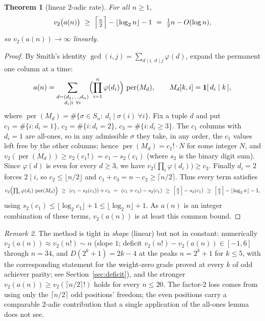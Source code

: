 \documentclass[11pt]{article}
\newtheorem{theorem}{Theorem}
\theoremstyle{remark}\newtheorem{remark}[theorem]{Remark}
\DeclareMathOperator{\perm}{per}
\begin{document}
\begin{theorem}[linear $2$-adic rate]\label{thm:linear}
For all $n\ge1$,
\[
  v_2\bigl(a(n)\bigr)\ \ge\ \Bigl\lceil \tfrac n2\Bigr\rceil-\lfloor\log_2 n\rfloor-1
  \ =\ \tfrac12 n-O(\log n),
\]
so $v_2(a(n))\to\infty$ \emph{linearly}.
\end{theorem}
\begin{proof}
By Smith's identity $\gcd(i,j)=\sum_{d\mid i,\ d\mid j}\varphi(d)$, expand the permanent one
column at a time:
\[
  a(n)=\sum_{\substack{d=(d_1,\dots,d_n)\\ d_i\mid i\ \forall i}}
        \Bigl(\prod_{i=1}^n\varphi(d_i)\Bigr)\,\perm(M_d),
  \qquad M_d[k,i]=\mathbf 1[\,d_i\mid k\,],
\]
where $\perm(M_d)=\#\{\sigma\in S_n:\ d_i\mid\sigma(i)\ \forall i\}$. Fix a tuple $d$ and put
$c_1=\#\{i:d_i=1\}$, $c_2=\#\{i:d_i=2\}$, $c_3=\#\{i:d_i\ge3\}$. The $c_1$ columns with $d_i=1$
are all-ones, so in any admissible $\sigma$ they take, in any order, the $c_1$ values left free by
the other columns; hence $\perm(M_d)=c_1!\cdot N$ for some integer $N$, and
$v_2(\perm(M_d))\ge v_2(c_1!)=c_1-s_2(c_1)$ (where $s_2$ is the binary digit sum). Since
$\varphi(d)$ is even for every $d\ge3$, we have $v_2\!\bigl(\prod_i\varphi(d_i)\bigr)\ge c_3$.
Finally $d_i=2$ forces $2\mid i$, so $c_2\le\lfloor n/2\rfloor$ and
$c_1+c_3=n-c_2\ge\lceil n/2\rceil$. Thus every term satisfies
\[
  v_2\Bigl(\textstyle\prod_i\varphi(d_i)\,\perm(M_d)\Bigr)
  \ \ge\ (c_1-s_2(c_1))+c_3
  \ =\ (c_1+c_3)-s_2(c_1)
  \ \ge\ \Bigl\lceil\tfrac n2\Bigr\rceil-s_2(c_1)
  \ \ge\ \Bigl\lceil\tfrac n2\Bigr\rceil-\lfloor\log_2 n\rfloor-1,
\]
using $s_2(c_1)\le\lfloor\log_2 c_1\rfloor+1\le\lfloor\log_2 n\rfloor+1$. As $a(n)$ is an integer
combination of these terms, $v_2(a(n))$ is at least this common bound.
\end{proof}

\begin{remark}
The method is tight in \emph{shape} (linear) but not in constant: numerically $v_2(a(n))\approx
v_2(n!)\sim n$ (slope $1$; deficit $v_2(n!)-v_2(a(n))\in[-1,6]$ through $n=34$, and $D(2^k+1)=2k-4$ at the peaks $n=2^k+1$ for
$k\le5$, with the corresponding statement for the weight-zero grade proved at every $k$ of odd
achiever parity; see Section~\ref{sec:deficit}), and the stronger
$v_2(a(n))\ge v_2(\lceil n/2\rceil!)$ holds for every $n\le20$. The factor-$2$ loss comes from
using only the $\lceil n/2\rceil$ odd positions' freedom; the even positions carry a comparable
$2$-adic contribution that a single application of the all-ones lemma does not see.
\end{remark}
\end{document}
